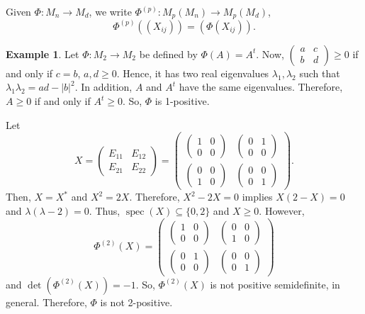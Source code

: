 \documentclass[12pt]{article}
\theoremstyle{definition}
\newtheorem*{example}{Example}
\begin{document}
Given $\Phi:M_n \to M_d$, we write $\Phi^{(p)}:M_p(M_n) \to M_p(M_d)$,
\[
\Phi^{(p)}((X_{ij})) = (\Phi(X_{ij})).
\]

\begin{example}
Let $\Phi:M_2 \to M_2$ be defined by $\Phi(A)=A^t$. Now, $\begin{pmatrix}a&c\\ b&d\end{pmatrix} \geq 0$ if and only if $c=b$, $a,d \geq 0$. Hence, it has two real eigenvalues $\lambda_1,\lambda_2$ such that $\lambda_1\lambda_2 = ad-|b|^2$. In addition, $A$ and $A^t$ have the same eigenvalues. Therefore, $A \geq 0$ if and only if $A^t \geq 0$. So, $\Phi$ is 1-positive.
\end{example}

Let
\[
X = \begin{pmatrix}E_{11} & E_{12}\\ E_{21} & E_{22}\end{pmatrix} = \begin{pmatrix}\begin{pmatrix}1&0\\0&0\end{pmatrix} & \begin{pmatrix}0&1\\0&0\end{pmatrix}\\ \begin{pmatrix}0&0\\1&0\end{pmatrix} & \begin{pmatrix}0&0\\0&1\end{pmatrix}\end{pmatrix}.
\]
Then, $X=X^*$ and $X^2=2X$. Therefore, $X^2-2X=0$ implies $X(2-X)=0$ and $\lambda(\lambda-2)=0$. Thus, $\operatorname{spec}(X) \subseteq \{0,2\}$ and $X \geq 0$. However,
\[
\Phi^{(2)}(X) = \begin{pmatrix}\begin{pmatrix}1&0\\0&0\end{pmatrix} & \begin{pmatrix}0&0\\1&0\end{pmatrix}\\ \begin{pmatrix}0&1\\0&0\end{pmatrix} & \begin{pmatrix}0&0\\0&1\end{pmatrix}\end{pmatrix}
\]
and $\det(\Phi^{(2)}(X))=-1$. So, $\Phi^{(2)}(X)$ is not positive semidefinite, in general. Therefore, $\Phi$ is not 2-positive.
\end{document}
